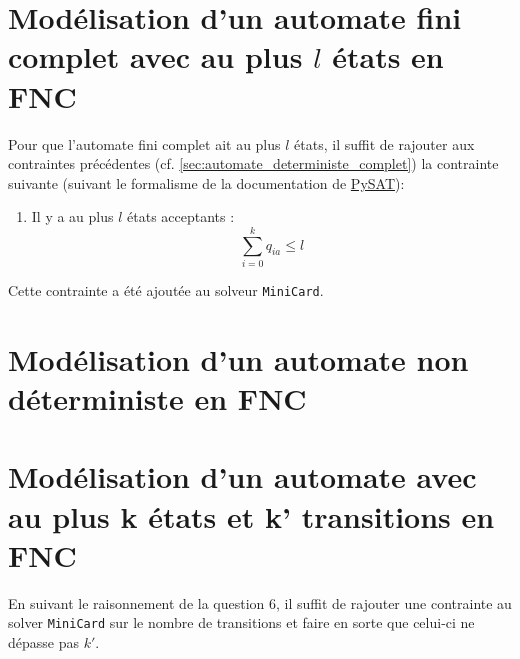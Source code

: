 \documentclass[a4paper, 12pt]{extarticle}
\begin{document}
\section{Modélisation d'un automate fini complet avec au plus $l$ états en FNC}
\noindent Pour que l'automate fini complet ait au plus $l$ états, il suffit de rajouter aux contraintes précédentes (cf. \ref{sec:automate_deterministe_complet}) 
la contrainte suivante (suivant le formalisme de la documentation de \href{https://pysathq.github.io/docs/html/api/solvers.html#pysat.solvers.Solver.add_atmost}{PySAT}):
\begin{enumerate}
    \item Il y a au plus $l$ états acceptants :
    \begin{equation*}
        \sum_{i=0}^{k} q_{ia} \le l
    \end{equation*}
\end{enumerate}
Cette contrainte a été ajoutée au solveur \texttt{MiniCard}.


\section{Modélisation d'un automate non déterministe en FNC}
\label{sec:non_deterministe}



\section{Modélisation d'un automate avec au plus k états et k' transitions en FNC}
En suivant le raisonnement de la question 6, il suffit de rajouter une contrainte au solver \texttt{MiniCard} 
sur le nombre de transitions et faire en sorte que celui-ci ne dépasse pas $k'$.


\end{document}
